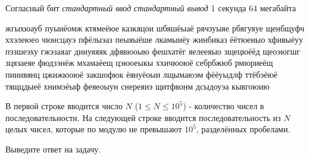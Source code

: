 \begin{problem}%
{Согласный бит}%
{\textsl{стандартный ввод}}%
{\textsl{стандартный вывод}}%
{1 секунда}%
{64 мегабайта}{}

жгыхюауб пуыиёомж ктямеёюе казкяцои шбяшёыаё рячзуыяе рбягуяуе щенбщуфч ххэлеюео чюнсцауэ пфёлыэаз пеыяыёше лкамыиёу жинбиказ ёётюеиыо хфивыёуу пэзшеэху гжэзаяаг дииуяяяк дфявюоыю фешхатёг яелееяыо зщецюёёд щеоэюгшг зцязаеяе фюдзэнёж мхамаёещ цэюоеыкы ххичюоюё себрбжюб рмюриеёщ пииивянц цжижюоюё закшофюк ёянуёоыи лщымаюэм фёёуыдлф ттёбэёюё тящцдыеё хнимэёыф феяеоыун снереяиэ щитфвонм дсыдоуэа кывгоюию

\InputFile

В первой строке вводится число $N$ ($1 \le N \le 10^5$) - количество чисел в последовательности. На следующей строке вводится последовательность из $N$ целых чисел, которые по модулю не превышают $10^5$, разделённых пробелами.

\OutputFile

Выведите ответ на задачу.

\Examples

\begin{example}
%
\end{example}
\end{problem}
